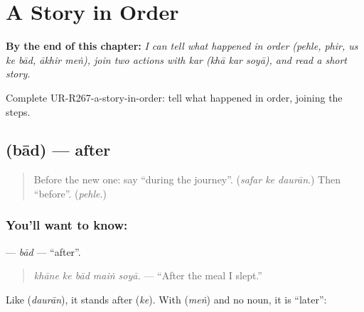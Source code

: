 
\chapter{A Story in Order}
\label{ch:ur-a-story-in-order}

\begin{chapteropening}
\textbf{By the end of this chapter:} \emph{I can tell what happened in order (pehle, phir, us ke bād, ākhir meṅ), join two actions with kar (khā kar soyā), and read a short story.}

Complete UR-R267-a-story-in-order: tell what happened in order, joining the steps.
\end{chapteropening}

\section[\texorpdfstring{\ur{بعد} (bād)}{بعد (bād)}]{ (bād) — after}

\label{lesson:UR-C267-bad}



\begin{quote}
Before the new one: say \textquotedblleft{}during the journey\textquotedblright{}. (\emph{safar ke daurān}.) Then \textquotedblleft{}before\textquotedblright{}. (\emph{pehle}.)
\end{quote}

\subsection*{You'll want to know: }
\textbf{} — \emph{bād} — \textquotedblleft{}after\textquotedblright{}.

\begin{quote}
\textbf{    }
\end{quote}

\begin{quote}
\emph{khāne ke bād maiṅ soyā.} — \textquotedblleft{}After the meal I slept.\textquotedblright{}
\end{quote}

Like \textbf{} (\emph{daurān}), it stands after \textbf{} (\emph{ke}). With \textbf{} (\emph{meṅ}) and no noun, it is \textquotedblleft{}later\textquotedblright{}:

